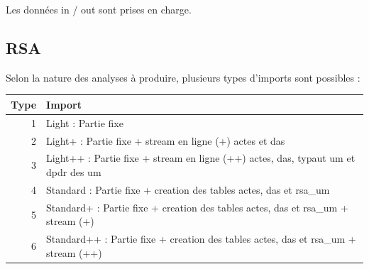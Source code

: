 \documentclass[]{book}
\begin{document}
Les données in / out sont prises en charge.

\subsection{RSA}\label{rsa}

Selon la nature des analyses à produire, plusieurs types d'imports sont
possibles :

\begin{longtable}[]{@{}rl@{}}
\toprule
\begin{minipage}[b]{0.06\columnwidth}\raggedleft\strut
Type\strut
\end{minipage} & \begin{minipage}[b]{0.88\columnwidth}\raggedright\strut
Import\strut
\end{minipage}\tabularnewline
\midrule
\endhead
\begin{minipage}[t]{0.06\columnwidth}\raggedleft\strut
1\strut
\end{minipage} & \begin{minipage}[t]{0.88\columnwidth}\raggedright\strut
Light : Partie fixe\strut
\end{minipage}\tabularnewline
\begin{minipage}[t]{0.06\columnwidth}\raggedleft\strut
2\strut
\end{minipage} & \begin{minipage}[t]{0.88\columnwidth}\raggedright\strut
Light+ : Partie fixe + stream en ligne (+) actes et das\strut
\end{minipage}\tabularnewline
\begin{minipage}[t]{0.06\columnwidth}\raggedleft\strut
3\strut
\end{minipage} & \begin{minipage}[t]{0.88\columnwidth}\raggedright\strut
Light++ : Partie fixe + stream en ligne (++) actes, das, typaut um et
dpdr des um\strut
\end{minipage}\tabularnewline
\begin{minipage}[t]{0.06\columnwidth}\raggedleft\strut
4\strut
\end{minipage} & \begin{minipage}[t]{0.88\columnwidth}\raggedright\strut
Standard : Partie fixe + creation des tables actes, das et rsa\_um\strut
\end{minipage}\tabularnewline
\begin{minipage}[t]{0.06\columnwidth}\raggedleft\strut
5\strut
\end{minipage} & \begin{minipage}[t]{0.88\columnwidth}\raggedright\strut
Standard+ : Partie fixe + creation des tables actes, das et rsa\_um +
stream (+)\strut
\end{minipage}\tabularnewline
\begin{minipage}[t]{0.06\columnwidth}\raggedleft\strut
6\strut
\end{minipage} & \begin{minipage}[t]{0.88\columnwidth}\raggedright\strut
Standard++ : Partie fixe + creation des tables actes, das et rsa\_um +
stream (++)\strut
\end{minipage}\tabularnewline
\bottomrule
\end{longtable}
\end{document}
